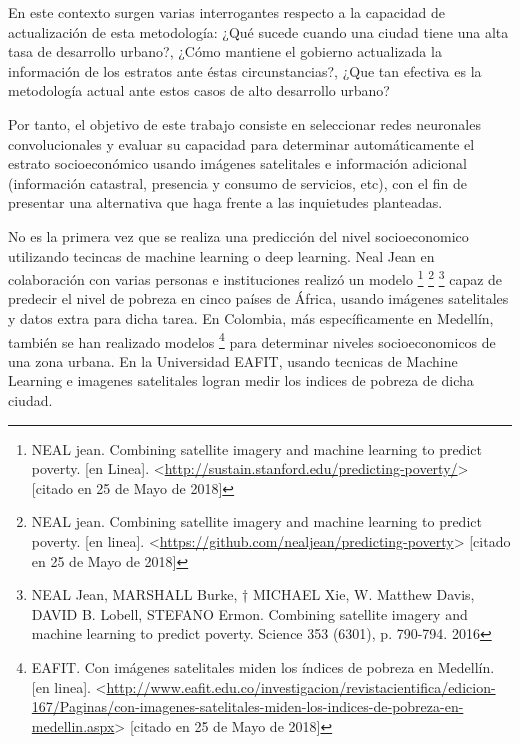     En este contexto surgen varias interrogantes respecto a la capacidad de actualización de esta metodología: ¿Qué sucede cuando una ciudad tiene una alta tasa de desarrollo urbano?, ¿Cómo mantiene el gobierno actualizada la información de los estratos ante éstas circunstancias?, ¿Que tan efectiva es la metodología actual ante estos casos de alto desarrollo urbano?
    
    Por tanto, el objetivo de este trabajo consiste en seleccionar redes neuronales convolucionales y evaluar su capacidad para determinar automáticamente el estrato socioeconómico usando imágenes satelitales e información adicional (información catastral, presencia y consumo de servicios, etc), con el fin de presentar una alternativa que haga frente a las inquietudes planteadas.
    
     No es la primera vez que se realiza una predicción del nivel socioeconomico utilizando tecincas de machine learning o deep learning. Neal Jean en colaboración con varias personas e instituciones realizó un modelo
     \footnote{NEAL jean. Combining satellite imagery and machine learning to predict poverty. [en Linea]. <\url{http://sustain.stanford.edu/predicting-poverty/}> [citado en 25 de Mayo de 2018]}
     \footnote{NEAL jean. Combining satellite imagery and machine learning to predict poverty. [en linea]. <\url{https://github.com/nealjean/predicting-poverty}> [citado en 25 de Mayo de 2018] }
     \footnote{NEAL Jean, MARSHALL Burke, † MICHAEL Xie, W. Matthew Davis, DAVID B. Lobell, STEFANO Ermon. Combining satellite imagery and machine learning to predict poverty. Science 353 (6301), p. 790-794. 2016} capaz de predecir el nivel de pobreza en cinco países de África, usando imágenes satelitales y datos extra para dicha tarea. En Colombia, más específicamente en Medellín, también se han realizado modelos
     \footnote{EAFIT. Con imágenes satelitales miden los índices de pobreza en Medellín. [en linea]. <\url{http://www.eafit.edu.co/investigacion/revistacientifica/edicion-167/Paginas/con-imagenes-satelitales-miden-los-indices-de-pobreza-en-medellin.aspx}> [citado en 25 de Mayo de 2018] } para determinar niveles socioeconomicos de una zona urbana. En la Universidad EAFIT, usando tecnicas de Machine Learning e imagenes satelitales logran medir los indices de pobreza de dicha ciudad.
    
    
    
    

